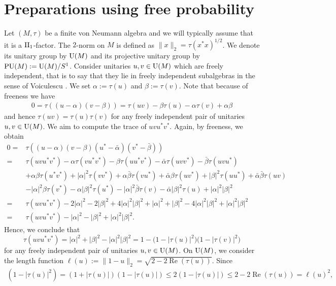 \section{Preparations using free probability}

Let $(M,\tau)$ be a finite von Neumann algebra and we will typically assume that it is a ${\rm II}_1$-factor. The $2$-norm on $M$ is defined as $\|x\|_2 = \tau(x^*x)^{1/2}$. We denote its unitary group by ${\rm U}(M)$ and its projective unitary group by ${\rm PU}(M):={\rm U}(M)/S^1$. Consider unitaries $u,v \in {\rm U}(M)$ which are freely independent, that is to say that they lie in freely independent subalgebras in the sense of Voiculescu \cite{MR1217253}. We set $\alpha := \tau(u)$ and $\beta := \tau(v)$. Note that because of freeness we have
\begin{gather*}
0 = \tau((u-\alpha)(v-\beta)) = \tau(uv) - \beta \tau(u) - \alpha \tau(v) + \alpha \beta
\end{gather*}
and hence $\tau(uv) = \tau(u)\tau(v)$ for any freely independent pair of unitaries $u,v \in {\rm U}(M)$. We aim to compute the trace of $uvu^*v^*$. Again, by freeness, we obtain
\begin{align*}
0 ={}& \tau((u-\alpha)(v-\beta)(u^* - \bar \alpha)(v^* - \bar \beta))
\\
={}& \tau(uvu^*v^*) - \alpha \tau(vu^*v^*) - \beta \tau(uu^*v^*) - \bar \alpha \tau(uvv^*) - \bar \beta \tau(uvu^*)
\\
& + \alpha \beta \tau(u^*v^*) + |\alpha|^2 \tau(vv^*) + \alpha \bar \beta \tau(vu^*) + \bar \alpha \beta \tau(uv^*) + |\beta|^2 \tau(uu^*) + \bar \alpha \bar \beta \tau(uv)
\\
& - |\alpha|^2 \beta \tau(v^*) - \alpha |\beta|^2 \tau(u^*) - |\alpha|^2 \bar \beta \tau(v) - \bar \alpha |\beta|^2 \tau(u) + |\alpha|^2|\beta|^2
\\
={}& \tau(uvu^*v^*) - 2|\alpha|^2 - 2 |\beta|^2 + 4 |\alpha|^2 |\beta|^2 + |\alpha|^2 + |\beta|^2 - 4 |\alpha|^2 |\beta|^2 + |\alpha|^2 |\beta|^2
\\
={}& \tau(uvu^*v^*) - |\alpha|^2 - |\beta|^2 + |\alpha|^2 |\beta|^2.
\end{align*}
Hence, we conclude that
\[
\tau(uvu^*v^*) = |\alpha|^2 + |\beta|^2 - |\alpha|^2 |\beta|^2 = 1 - \big(1-|\tau(u)|^2\big)\big(1-|\tau(v)|^2\big)
\] for any freely independent pair of unitaries $u,v \in {\rm U}(M)$.
On ${\rm U}(M)$, we consider the length function $\ell(u):= \|1-u\|_2 = \sqrt{2-2 \operatorname{Re}(\tau(u))}$.
Since
\begin{gather*}
(1-|\tau(u)|^2) = (1+ |\tau(u)|)(1-|\tau(u)|) \leq 2 (1-|\tau(u)|) \leq 2 - 2\operatorname{Re}(\tau(u)) = \ell(u)^2,
\end{gather*}
